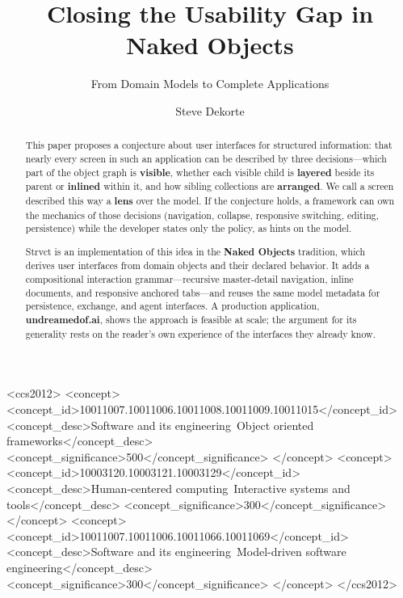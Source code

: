 \documentclass[sigplan,review,anonymous,10pt]{acmart}
\begin{document}
\sloppy

\title{Closing the Usability Gap in Naked Objects}
\subtitle{From Domain Models to Complete Applications}

\author{Steve Dekorte}

\begin{abstract}
This paper proposes a conjecture about user interfaces for structured information: that nearly every screen in such an application can be described by three decisions---which part of the object graph is \textbf{visible}, whether each visible child is \textbf{layered} beside its parent or \textbf{inlined} within it, and how sibling collections are \textbf{arranged}. We call a screen described this way a \textbf{lens} over the model. If the conjecture holds, a framework can own the mechanics of those decisions (navigation, collapse, responsive switching, editing, persistence) while the developer states only the policy, as hints on the model.

Strvct is an implementation of this idea in the \textbf{Naked Objects} tradition, which derives user interfaces from domain objects and their declared behavior. It adds a compositional interaction grammar---recursive master-detail navigation, inline documents, and responsive anchored tabs---and reuses the same model metadata for persistence, exchange, and agent interfaces. A production application, \textbf{undreamedof.ai}, shows the approach is feasible at scale; the argument for its generality rests on the reader's own experience of the interfaces they already know.
\end{abstract}

\begin{CCSXML}
<ccs2012>
   <concept>
       <concept_id>10011007.10011006.10011008.10011009.10011015</concept_id>
       <concept_desc>Software and its engineering~Object oriented frameworks</concept_desc>
       <concept_significance>500</concept_significance>
   </concept>
   <concept>
       <concept_id>10003120.10003121.10003129</concept_id>
       <concept_desc>Human-centered computing~Interactive systems and tools</concept_desc>
       <concept_significance>300</concept_significance>
   </concept>
   <concept>
       <concept_id>10011007.10011006.10011066.10011069</concept_id>
       <concept_desc>Software and its engineering~Model-driven software engineering</concept_desc>
       <concept_significance>300</concept_significance>
   </concept>
</ccs2012>
\end{CCSXML}
\end{document}
